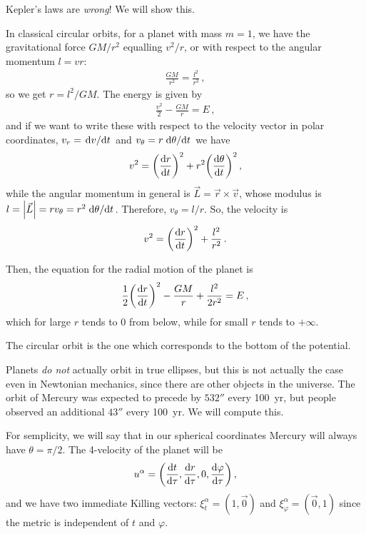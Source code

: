 \documentclass[main.tex]{subfiles}
\begin{document}
Kepler's laws are \emph{wrong}! We will show this.

In classical circular orbits, for a planet with mass \(m=1\), we have the gravitational force \(GM/r^2\) equalling \(v^2/r\), or with respect to the angular momentum \(l = vr\): 
%
\begin{align}
  \frac{GM}{r^2} = \frac{l^2}{r^3}
\,,
\end{align}
%
so we get \(r = l^2/GM\). The energy is given by 
%
\begin{align}
  \frac{v^2}{2} - \frac{GM}{r} = E
\,,
\end{align}
%
and if we want to write these with respect to the velocity vector in polar coordinates, \(v_r = \dv*{v}{t}\) and \(v_\theta = r \dv*{\theta }{t}\) we have 
%
\begin{align}
  v^2 = \qty(\dv{r}{t})^2 + r^2 \qty(\dv{\theta }{t})^2
\,,
\end{align}
%
while the angular momentum in general is \(\vec{L} = \vec{r} \times \vec{v}\), whose modulus is \(l = \abs{\vec{L}} = r v_{\theta } = r^2 \dv*{\theta }{t}\).
Therefore, \(v_{\theta } = l/r\). So, the velocity is 
%
\begin{align}
  v^2= \qty(\dv{r}{t})^2 + \frac{l^2}{r^2}
\,.
\end{align}

Then, the equation for the radial motion of the planet is 
%
\begin{align}
  \frac{1}{2} \qty(\dv{r}{t})^2 - \frac{GM}{r} + \frac{l^2}{2r^2} = E
\,,
\end{align}
%
which for large \(r\) tends to 0 from below, while for small \(r\) tends to \(+ \infty\).

The circular orbit is the one which corresponds to the bottom of the potential.

Planets \emph{do not} actually orbit in true ellipses, but this is not actually the case even in Newtonian mechanics, since there are other objects in the universe.
The orbit of Mercury was expected to precede by \(532''\) every \SI{100}{yr}, but people observed an additional \(43''\) every \SI{100}{yr}.
We will compute this.

For semplicity, we will say that in our spherical coordinates Mercury will always have \(\theta = \pi /2\).
The 4-velocity of the planet will be 
%
\begin{align}
  u^{\alpha } = \qty(\dv{t}{\tau }, \dv{r}{\tau }, 0, \dv{\varphi }{\tau })
\,,
\end{align}
%
and we have two immediate Killing vectors: \(\xi^{\alpha }_t= (1, \vec{0} )\) and \(\xi^{\alpha }_\varphi = (\vec{0}, 1)\) since the metric is independent of \(t\) and \(\varphi\).
\end{document}
